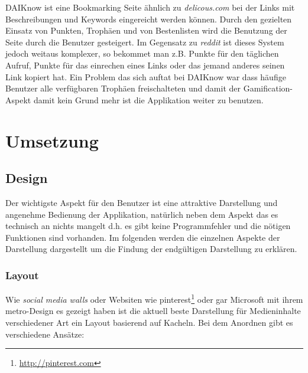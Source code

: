 \documentclass[12pt,twoside]{book}
\begin{document}
DAIKnow \citep{meder2014daiknow} ist eine Bookmarking Seite ähnlich zu \textit{delicous.com} bei der Links mit Beschreibungen und Keywords eingereicht werden können. Durch den gezielten Einsatz von Punkten, Trophäen und von Bestenlisten wird die Benutzung der Seite durch die Benutzer gesteigert. Im Gegensatz zu \textit{reddit} ist dieses System jedoch weitaus komplexer, so bekommet man z.B. Punkte für den täglichen Aufruf, Punkte für das einrechen eines Links oder das jemand anderes seinen Link kopiert hat.
Ein Problem das sich auftat bei DAIKnow war dass häufige Benutzer alle verfügbaren Trophäen freischalteten und damit der Gamification-Aspekt damit kein Grund mehr ist die Applikation weiter zu benutzen.

\chapter{Umsetzung}

\section*{Design}

Der wichtigste Aspekt für den Benutzer ist eine attraktive Darstellung und angenehme Bedienung der Applikation, natürlich neben dem Aspekt das es technisch an nichts mangelt d.h. es gibt keine Programmfehler und die nötigen Funktionen sind vorhanden. Im folgenden werden die einzelnen Aspekte der Darstellung dargestellt um die Findung der endgültigen Darstellung zu erklären.

\subsection*{Layout}

Wie \textit{social media walls} oder Websiten wie pinterest\footnote{\url{http://pinterest.com}} oder gar Microsoft mit ihrem metro-Design es gezeigt haben ist die aktuell beste Darstellung für Medieninhalte verschiedener Art ein Layout basierend auf Kacheln. Bei dem Anordnen gibt es verschiedene Ansätze:
\end{document}
